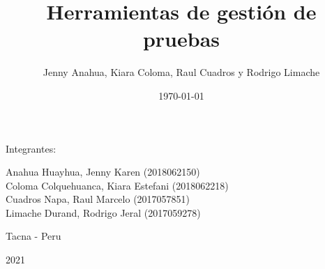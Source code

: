 \documentclass[twoside,twocolumn]{article}
\begin{document}
\begin{titlepage}
\begin{center}
\vspace*{0.2in}
\vspace*{0.1in}
\begin{large}
Integrantes: \\
\begin{flushleft}
Anahua Huayhua, Jenny Karen		\hfill	(2018062150) \\
Coloma Colquehuanca, Kiara Estefani		\hfill	(2018062218) \\
Cuadros Napa, Raul Marcelo         	\hfill	(2017057851) \\
Limache Durand, Rodrigo Jeral      	\hfill	(2017059278) \\
\end{flushleft}
\end{large}
\vspace*{0.8in}
Tacna - Peru\end{center}
\begin{center}
2021\end{center}
\end{titlepage}
\setlength{\droptitle}{-4\baselineskip} %
\pretitle{\begin{center}\Huge\bfseries} %
\posttitle{\end{center}} %
\title{Herramientas de gestión de pruebas} %
\author{Jenny Anahua, Kiara Coloma, Raul Cuadros y Rodrigo Limache}
\date{\today} %
\end{document}
